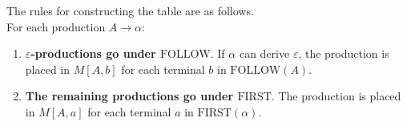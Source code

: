 \documentclass[12pt,letterpaper]{article}
\begin{document}
The rules for constructing the table are as follows.\\

For each production $A \rightarrow \alpha$:
\begin{enumerate}
    \item \textbf{$\varepsilon$-productions go under $\text{FOLLOW}$}. If $\alpha$ can derive $\varepsilon$, the production is placed in $M[A, b]$ for each terminal $b$ in $\text{FOLLOW}(A)$.
    \item \textbf{The remaining productions go under $\text{FIRST}$}. The production is placed in $M[A, a]$ for each terminal $a$ in $\text{FIRST}(\alpha)$.
\end{enumerate}

\end{document}
